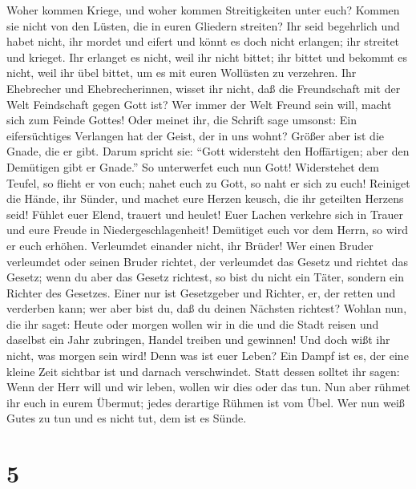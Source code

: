  Woher kommen Kriege, und woher kommen Streitigkeiten
unter euch? Kommen sie nicht von den Lüsten, die in euren Gliedern
streiten?  Ihr seid begehrlich und habet nicht, ihr mordet
und eifert und könnt es doch nicht erlangen; ihr streitet und krieget.
 Ihr erlanget es nicht, weil ihr nicht bittet; ihr bittet
und bekommt es nicht, weil ihr übel bittet, um es mit euren Wollüsten zu
verzehren.  Ihr Ehebrecher und Ehebrecherinnen, wisset ihr
nicht, daß die Freundschaft mit der Welt Feindschaft gegen Gott ist? Wer
immer der Welt Freund sein will, macht sich zum Feinde Gottes!
 Oder meinet ihr, die Schrift sage umsonst: Ein
eifersüchtiges Verlangen hat der Geist, der in uns wohnt? 
Größer aber ist die Gnade, die er gibt. Darum spricht sie: ``Gott
widersteht den Hoffärtigen; aber den Demütigen gibt er Gnade.''
 So unterwerfet euch nun Gott! Widerstehet dem Teufel, so
flieht er von euch;  nahet euch zu Gott, so naht er sich
zu euch! Reiniget die Hände, ihr Sünder, und machet eure Herzen keusch,
die ihr geteilten Herzens seid!  Fühlet euer Elend,
trauert und heulet! Euer Lachen verkehre sich in Trauer und eure Freude
in Niedergeschlagenheit!  Demütiget euch vor dem Herrn,
so wird er euch erhöhen.  Verleumdet einander nicht, ihr
Brüder! Wer einen Bruder verleumdet oder seinen Bruder richtet, der
verleumdet das Gesetz und richtet das Gesetz; wenn du aber das Gesetz
richtest, so bist du nicht ein Täter, sondern ein Richter des Gesetzes.
 Einer nur ist Gesetzgeber und Richter, er, der retten
und verderben kann; wer aber bist du, daß du deinen Nächsten richtest?
 Wohlan nun, die ihr saget: Heute oder morgen wollen wir
in die und die Stadt reisen und daselbst ein Jahr zubringen, Handel
treiben und gewinnen!  Und doch wißt ihr nicht, was
morgen sein wird! Denn was ist euer Leben? Ein Dampf ist es, der eine
kleine Zeit sichtbar ist und darnach verschwindet.  Statt
dessen solltet ihr sagen: Wenn der Herr will und wir leben, wollen wir
dies oder das tun.  Nun aber rühmet ihr euch in eurem
Übermut; jedes derartige Rühmen ist vom Übel.  Wer nun
weiß Gutes zu tun und es nicht tut, dem ist es Sünde.

\hypertarget{section-4}{%
\section{5}\label{section-4}}

